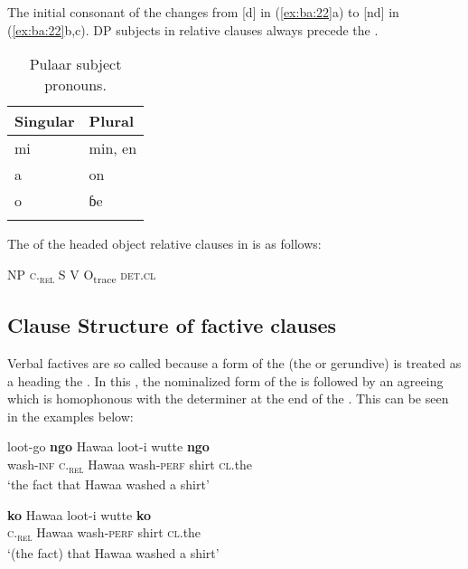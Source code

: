 \documentclass[output=paper,
modfonts
]{langscibook}
\begin{document}
The initial consonant of the  changes from [d] in (\ref{ex:ba:22}a) to [nd] in (\ref{ex:ba:22}b,c). DP subjects in relative clauses always precede the . 
 
\begin{table}
\caption{Pulaar subject pronouns.}
\label{tab:ba:4}
\begin{tabular}{ll}
\lsptoprule
{ {Singular}}  & { {Plural}} \\\midrule
{ mi} & { min, en}\\
{ a} & { on}\\
{ o} & { ɓe}\\
\lspbottomrule
\end{tabular}
\end{table}

The  of the headed object relative clauses in  is as follows: 

\ea
  NP   \hspace{1em}     \textsc{c.}\textsc{\textsubscript{rel}}     \hspace{1em}    S     \hspace{1em}     V     \hspace{1em}    O\textsubscript{trace}   \hspace{1em}    \textsc{det.cl}  
\z

\newpage
\subsection{Clause Structure of factive clauses}\label{sec:ba:4.2}

Verbal factives are so called because a form of the  (the  or gerundive) is treated as a  heading the  . In this , the nominalized form of the  is followed by an agreeing  which is homophonous with the determiner at the end of the . This can be seen in the examples below:

\ea \renewcommand{\currentjam}{Verbal Factive}\settowidth\jamwidth{\currentjam} 
\gll   loot-go      \textbf{ngo}      Hawaa    loot-i            wutte    \textbf{ngo} \\                           
wash-\textsc{inf}    \textsc{c.}\textsc{\textsubscript{rel}}       Hawaa    wash-\textsc{perf}     shirt    \textsc{cl.}the\\\jambox{\currentjam}
\glt ‘the fact that Hawaa washed a shirt’
\z

\ea
\gll   \textbf{ko}       Hawaa     loot-i             wutte      \textbf{ko}\\
   \textsc{c.}\textsc{\textsubscript{rel}}   Hawaa    wash-\textsc{perf}   shirt      \textsc{cl.}the  \\
   \glt ‘(the fact) that Hawaa washed a shirt’
   \z
\end{document}
